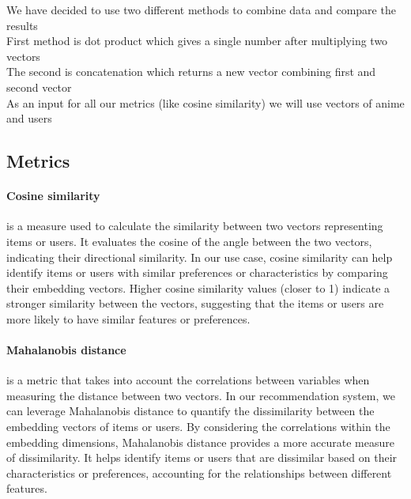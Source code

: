 We have decided to use two different methods to combine data and compare the results \\ 
First method is dot product which gives a single number after multiplying two vectors \\ 
The second is concatenation which returns a new vector combining first and second vector \\ 
As an input for all our metrics (like cosine similarity) we will use vectors of anime and users


\subsection{Metrics}
\paragraph{Cosine similarity} is a measure used to calculate the similarity between two vectors representing items or users. It evaluates the cosine of the angle between the two vectors, indicating their directional similarity. In our use case, cosine similarity can help identify items or users with similar preferences or characteristics by comparing their embedding vectors. Higher cosine similarity values (closer to 1) indicate a stronger similarity between the vectors, suggesting that the items or users are more likely to have similar features or preferences.
\paragraph{Mahalanobis distance} is a metric that takes into account the correlations between variables when measuring the distance between two vectors. In our recommendation system, we can leverage Mahalanobis distance to quantify the dissimilarity between the embedding vectors of items or users. By considering the correlations within the embedding dimensions, Mahalanobis distance provides a more accurate measure of dissimilarity. It helps identify items or users that are dissimilar based on their characteristics or preferences, accounting for the relationships between different features.

